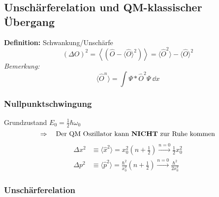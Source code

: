 \subsection{Unschärferelation und QM-klassischer Übergang}

\textbf{Definition:} Schwankung/Unschärfe
\begin{equation*}
\left(\Delta O\right)^2 = \left\langle \left(\hat{O} - \langle \hat{O} \rangle ^2\right) \right\rangle = \langle \hat{O}^2 \rangle - \langle \hat{O} \rangle^2
\end{equation*}
\emph{Bemerkung:}
\begin{equation*}
\langle \hat{O}^n \rangle = \int \Psi* \hat{O}^2 \Psi \ \dd x
\end{equation*}

\subsubsection{Nullpunktschwingung}

Grundzustand $ E_0 = \frac{1}{2} \hbar \omega_0 $
\begin{equation*}
\Rightarrow \quad \textrm{Der QM Oszillator kann \textbf{NICHT} zur Ruhe kommen}
\end{equation*}
\begin{align*}
\Delta x^2 &\equiv \langle \hat{x}^2 \rangle = x_0^2 \left(n + \frac{1}{2}\right) \overset{n = 0}{\longrightarrow} \frac{1}{2} x_0^2\\
\Delta p^2 &\equiv \langle \hat{p}^2 \rangle = \frac{\hbar^2}{x_0^2} \left(n + \frac{1}{2}\right) \overset{n = 0}{\longrightarrow} \frac{\hbar^2}{2 x_0^2}
\end{align*}

\subsubsection{Unschärferelation}

